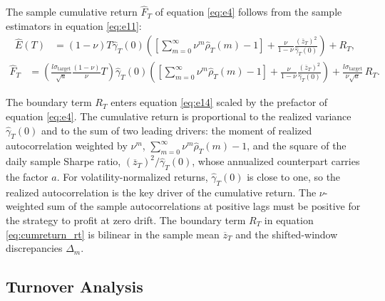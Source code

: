 \documentclass[hidelinks]{siamonline250211}
\begin{document}
\begin{corollary} The sample cumulative return $\hat{F}_{T}$ of equation \eqref{eq:e4} follows from the sample estimators in equation \eqref{eq:e11}:
	\begin{equation} \label{eq:e12} 
		\begin{split}
			\hat{E}(T)& =   \left(1-\nu \right)   T  \hat{\gamma}_{T}(0)\left(  \left[ \sum^{\infty}_{m=0} \nu^{m} \hat{\rho}_{T}(m) -  1 \right] + \frac{\nu}{1-\nu}\frac{(\overline{z}_{T})^{2}}{\hat{\gamma}_{T}(0)}\right) + R_{T},
		\end{split}
	\end{equation}
	\begin{equation} \label{eq:e14} 
		\begin{split}
			\hat{F}_{T} &   =\left( \frac{l\sigma_{\mathrm{target}} }{\sqrt{a}} \frac{\left(1-\nu \right)}{\nu}   T \right)    \hat{\gamma}_{T}(0)  \left( \left[ \sum^{\infty}_{m=0} \nu^{m} \hat{\rho}_{T}(m) -  1 \right]  + \frac{\nu}{1-\nu}\frac{(\overline{z}_{T})^{2}}{\hat{\gamma}_{T}(0)} \right) + \frac{l\sigma_{\mathrm{target}}}{\nu\sqrt{a}}\, R_{T}.
		\end{split}
	\end{equation}
	
\end{corollary}

The boundary term $R_{T}$ enters equation \eqref{eq:e14} scaled by the prefactor of equation \eqref{eq:e4}. The cumulative return is proportional to the realized variance $\hat{\gamma}_{T}(0)$ and to the sum of two leading drivers: the moment of realized autocorrelation weighted by $\nu^{m}$, $\sum^{\infty}_{m=0} \nu^{m} \hat{\rho}_{T}(m) -  1$, and the square of the daily sample Sharpe ratio, $(\overline{z}_{T})^{2}/\hat{\gamma}_{T}(0)$, whose annualized counterpart carries the factor $a$. For volatility-normalized returns, $\hat{\gamma}_{T}(0)$ is close to one, so the realized autocorrelation is the key driver of the cumulative return. The $\nu$-weighted sum of the sample autocorrelations at positive lags must be positive for the strategy to profit at zero drift. The boundary term $R_{T}$ in equation \eqref{eq:cumreturn_rt} is bilinear in the sample mean $\overline{z}_{T}$ and the shifted-window discrepancies $\Delta_{m}$. 



\subsection{Turnover Analysis}
\end{document}
